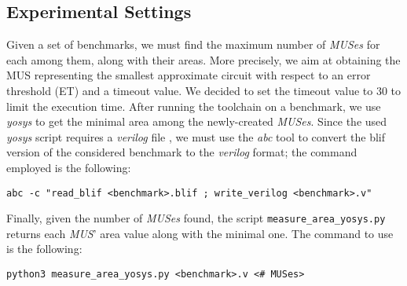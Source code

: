 \documentclass[]{usiinfbachelorproject}
\begin{document}
\subsection{Experimental Settings}\label{subsec:experimental-settings}
Given a set of benchmarks, we must find the maximum number of \textit{MUSes} for each among them, along with their areas. More precisely, we aim at obtaining the MUS representing the smallest approximate circuit with respect to an error threshold (ET) and a timeout value. We decided to set the timeout value to $30$ to limit the execution time. After running the toolchain on a benchmark, we use \textit{yosys} \cite{yosys} to get the minimal area among the newly-created \textit{MUSes}. Since the used \textit{yosys} script requires a \textit{verilog} file \cite{verilog}, we must use the \textit{abc} tool \cite{abc} to convert the blif version of the considered benchmark to the \textit{verilog} format; the command employed is the following:
\begin{center}
    \texttt{abc -c "read\_blif <benchmark>.blif ; write\_verilog <benchmark>.v"}
\end{center}
Finally, given the number of \textit{MUSes} found, the script \texttt{measure\_area\_yosys.py} returns each \textit{MUS}' area value along with the minimal one. The command to use is the following:
\begin{center}
    \texttt{python3 measure\_area\_yosys.py <benchmark>.v <\# MUSes>
}
\end{center}

\end{document}
